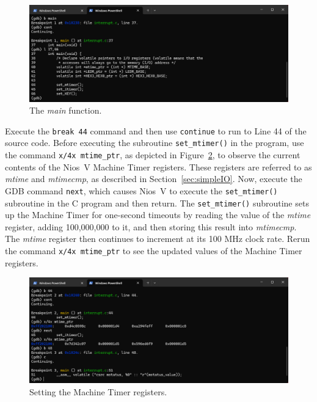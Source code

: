 \documentclass[11pt, twoside, pdftex]{article}
\begin{document}
\begin{figure}[h]
    \begin{center}
        \includegraphics[scale=.6]{figures/interrupt_C1.png}
        \caption{The {\it main} function.}
        \label{fig:interrupt_C1}
    \end{center}
\end{figure}

Execute the \texttt{break 44} command and then use \texttt{continue} to run to Line 44 of the 
source code. Before executing the subroutine \texttt{set\_mtimer()} in the program, use the
command \texttt{x/4x mtime\_ptr}, as depicted in Figure~\ref{fig:interrupt_C2}, to observe the
current contents of the Nios~V Machine Timer registers. These registers are referred to as
{\it mtime} and {\it mtimecmp}, as described in Section~\ref{sec:simpleIO}. Now, execute the
GDB command \texttt{next}, which causes Nios~V to execute the \texttt{set\_mtimer()} subroutine
in the C program and then return. The \texttt{set\_mtimer()} subroutine sets up the
Machine Timer for one-second timeouts by reading the value of the {\it mtime} register, 
adding 100,000,000 to it, and then storing this result into {\it mtimecmp}. The
{\it mtime} register then continues to increment at its 100 MHz clock rate. Rerun the 
command \texttt{x/4x mtime\_ptr} to see the updated values of the Machine Timer registers. 

\begin{figure}[h]
    \begin{center}
        \includegraphics[scale=.6]{figures/interrupt_C2.png}
        \caption{Setting the Machine Timer registers.}
        \label{fig:interrupt_C2}
    \end{center}
\end{figure}
\end{document}
